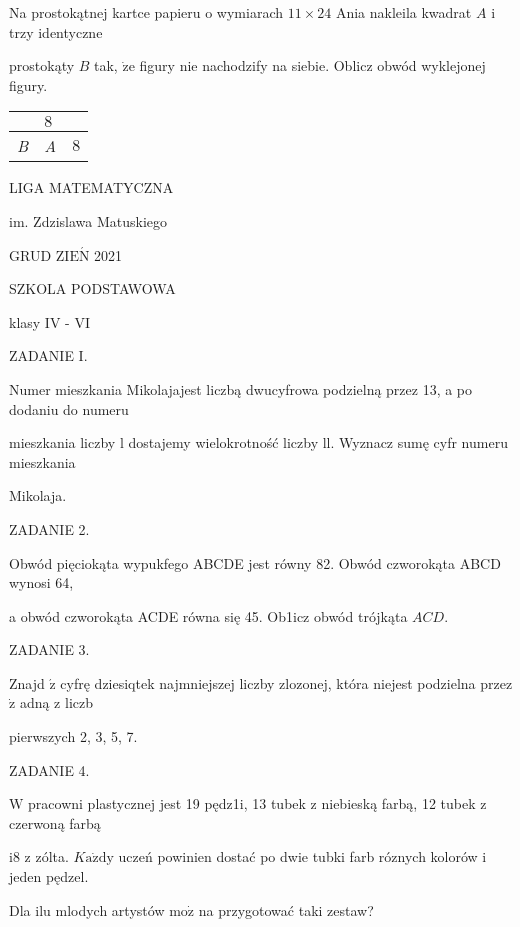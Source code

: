 \documentclass[a4paper,12pt]{article}
\begin{document}
Na prostokątnej kartce papieru o wymiarach $11\times 24$ Ania nakleila kwadrat $A$ i trzy identyczne

prostokąty $B$ tak, $\dot{\mathrm{z}}\mathrm{e}$ figury nie nachodzify na siebie. Oblicz obwód wyklejonej figury.
\begin{center}
\begin{tabular}{|l|l|l|}
\hline
\multicolumn{1}{|l|}{}&	\multicolumn{1}{|l|}{$8$}&	\multicolumn{1}{|l|}{}	\\
\hline
\multicolumn{1}{|l|}{{\it B}}&	\multicolumn{1}{|l|}{{\it A}}&	\multicolumn{1}{|l|}{$8$}	\\
\hline
\end{tabular}

\end{center}





LIGA MATEMATYCZNA

im. Zdzislawa Matuskiego

GRUD Z$\mathrm{I}\mathrm{E}\acute{\mathrm{N}}$ 2021

SZKOLA PODSTAWOWA

klasy IV - VI

ZADANIE I.

Numer mieszkania Mikolajajest liczbą dwucyfrowa podzielną przez 13, a po dodaniu do numeru

mieszkania liczby l dostajemy wielokrotność liczby ll. Wyznacz sumę cyfr numeru mieszkania

Mikolaja.

ZADANIE 2.

Obwód pięciokąta wypukfego ABCDE jest równy 82. Obwód czworokąta ABCD wynosi 64,

a obwód czworokąta ACDE równa się 45. Ob1icz obwód trójkąta $ACD.$

ZADANIE 3.

Znajd $\acute{\mathrm{z}}$ cyfrę dziesiqtek najmniejszej liczby zlozonej, która niejest podzielna przez $\dot{\mathrm{z}}$ adną z liczb

pierwszych 2, 3, 5, 7.

ZADANIE 4.

$\mathrm{W}$ pracowni plastycznej jest 19 pędz1i, 13 tubek z niebieską farbą, 12 tubek z czerwoną farbą

$\mathrm{i}8$ z zólta. $K\mathrm{a}\dot{\mathrm{z}}\mathrm{d}\mathrm{y}$ uczeń powinien dostać po dwie tubki farb róznych kolorów i jeden pędzel.

Dla ilu mlodych artystów $\mathrm{m}\mathrm{o}\dot{\mathrm{z}}$ na przygotować taki zestaw?
\end{document}
